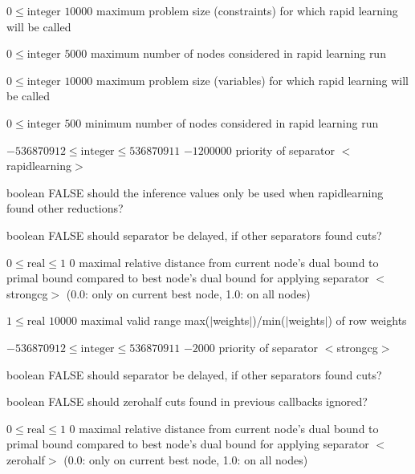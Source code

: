%
{$0\leq\textrm{integer}$}%
{$10000$}%
{maximum problem size (constraints) for which rapid learning will be called}%
{}

%
{$0\leq\textrm{integer}$}%
{$5000$}%
{maximum number of nodes considered in rapid learning run}%
{}

%
{$0\leq\textrm{integer}$}%
{$10000$}%
{maximum problem size (variables) for which rapid learning will be called}%
{}

%
{$0\leq\textrm{integer}$}%
{$500$}%
{minimum number of nodes considered in rapid learning run}%
{}

%
{$-536870912\leq\textrm{integer}\leq536870911$}%
{$-1200000$}%
{priority of separator $<$rapidlearning$>$}%
{}

%
{boolean}%
{FALSE}%
{should the inference values only be used when rapidlearning found other reductions?}%
{}

%
{boolean}%
{FALSE}%
{should separator be delayed, if other separators found cuts?}%
{}

%
{$0\leq\textrm{real}\leq1$}%
{$0$}%
{maximal relative distance from current node's dual bound to primal bound compared to best node's dual bound for applying separator $<$strongcg$>$ (0.0: only on current best node, 1.0: on all nodes)}%
{}

%
{$1\leq\textrm{real}$}%
{$10000$}%
{maximal valid range max($|$weights$|$)/min($|$weights$|$) of row weights}%
{}

%
{$-536870912\leq\textrm{integer}\leq536870911$}%
{$-2000$}%
{priority of separator $<$strongcg$>$}%
{}

%
{boolean}%
{FALSE}%
{should separator be delayed, if other separators found cuts?}%
{}

%
{boolean}%
{FALSE}%
{should zerohalf cuts found in previous callbacks ignored?}%
{}

%
{$0\leq\textrm{real}\leq1$}%
{$0$}%
{maximal relative distance from current node's dual bound to primal bound compared to best node's dual bound for applying separator $<$zerohalf$>$ (0.0: only on current best node, 1.0: on all nodes)}%
{}

